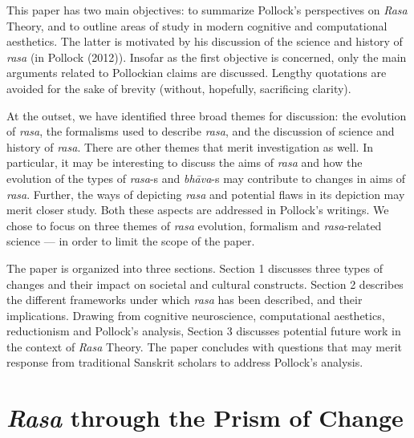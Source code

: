 This paper has two main objectives: to summarize Pollock’s perspectives on \textsl{Rasa} Theory, and to outline areas of study in modern cognitive and computational aesthetics. The latter is motivated by his discussion of the science and history of \textsl{rasa} (in Pollock (2012)). Insofar as the first objective is concerned, only the main arguments related to Pollockian claims are discussed. Lengthy quotations are avoided for the sake of brevity (without, hopefully, sacrificing clarity). 

At the outset, we have identified three broad themes for discussion: the evolution of \textsl{rasa}, the formalisms used to describe \textsl{rasa}, and the discussion of science and history of \textsl{rasa}. There are other themes that merit investigation as well. In particular, it may be interesting to discuss the aims of \textsl{rasa} and how the evolution of the types of \hbox{\textsl{rasa}-s} and \textsl{bhāva}-s may contribute to changes in aims of \textsl{rasa}. Further, the ways of depicting \textsl{rasa} and potential flaws in its depiction may merit closer study. Both these aspects are addressed in Pollock’s writings. We chose to focus on three themes of \textsl{rasa} evolution, formalism and \textsl{rasa}-related science --- in order to limit the scope of the paper. 

The paper is organized into three sections. Section 1 discusses three types of changes and their impact on societal and cultural constructs. Section 2 describes the different frameworks under which \textsl{rasa} has been described, and their implications. Drawing from cognitive neuroscience, computational aesthetics, reductionism and Pollock’s analysis, Section 3 discusses potential future work in the context of \textsl{Rasa} Theory. The paper concludes with questions that may merit response from traditional Sanskrit scholars to address Pollock’s analysis.\\[-20pt]

\section*{\textsl{Rasa} through the Prism of Change}

